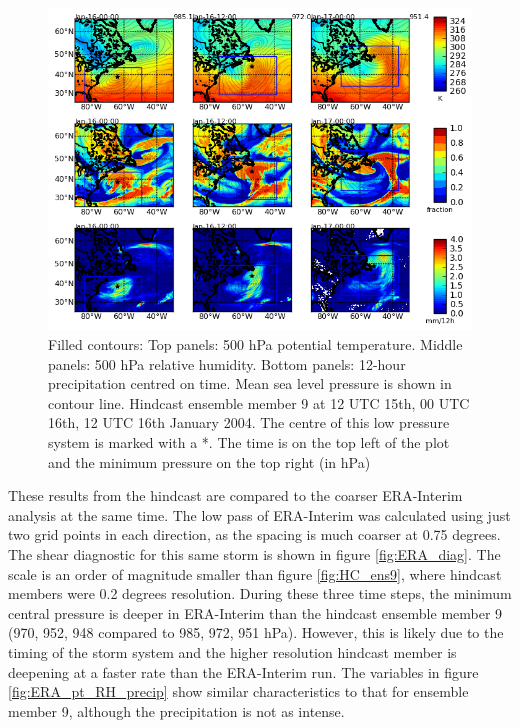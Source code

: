 \begin{figure}	%
	\includegraphics[width=36pc,angle=0]{plot_var_poly_ens9_ptRHprecip_12UTC_15.png} %
	\caption{Filled contours: Top panels: 500 hPa potential temperature. Middle panels: 500 hPa relative humidity. Bottom panels: 12-hour precipitation centred on time. Mean sea level pressure is shown in contour line. Hindcast ensemble member 9 at 12 UTC 15th, 00 UTC 16th, 12 UTC 16th January 2004. The centre of this low pressure system is marked with a *. The time is on the top left of the plot and the minimum pressure on the top right (in hPa)}\label{fig:HC_ens9_pt_RH_precip}
	\centering
\end{figure}



These results from the hindcast are compared to the coarser ERA-Interim analysis at the same time. The low pass of ERA-Interim was calculated using just two grid points in each direction, as the spacing is much coarser at 0.75 degrees. The shear diagnostic for this same storm is shown in figure \ref{fig:ERA_diag}. The scale is an order of magnitude smaller than figure \ref{fig:HC_ens9}, where hindcast members were 0.2 degrees resolution. During these three time steps, the minimum central pressure is deeper in ERA-Interim than the hindcast ensemble member 9 (970, 952, 948 compared to 985, 972, 951 hPa). However, this is likely due to the timing of the storm system and the higher resolution hindcast member is deepening at a faster rate than the ERA-Interim run. The variables in figure \ref{fig:ERA_pt_RH_precip} show similar characteristics to that for ensemble member 9, although the precipitation is not as intense.


